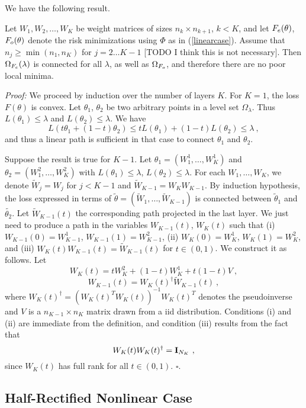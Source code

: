 We have the following result.
\begin{proposition}
\label{proplinear}
Let $W_1, W_2, \dots, W_K$ be weight matrices of sizes 
$n_k \times n_{k+1}$, $k < K$, and let $F_{e}(\theta)$, $F_{o}(\theta)$ 
denote the risk minimizations using $\Phi$ as in (\ref{linearcase}).
Assume that $n_j \geq \min(n_1, n_K)$ for $j=2 \dots K-1$ [TODO I think this is not necessary].
Then $\Omega_{F_{e}}(\lambda)$ is connected for all $\lambda$, as well as $\Omega_{F_{o}}$, 
and therefore there are no poor local minima.  
\end{proposition}
{\it Proof:} We proceed by induction over the number of layers $K$. 
For $K=1$, the loss $F(\theta)$ is convex. Let  $\theta_1$, $\theta_2$ be two arbitrary points 
in a level set $\Omega_\lambda$. Thus $L(\theta_1) \leq \lambda$ and $L(\theta_2) \leq \lambda$. We have
$$L( t \theta_1 + (1-t) \theta_2) \leq t L(\theta_1) + (1-t) L(\theta_2) \leq \lambda~,$$
and thus a linear path is sufficient in that case to connect $\theta_1$ and $\theta_2$.

Suppose the result is true for $K-1$. Let $\theta_1 = (W_1^1, \dots, W^1_K)$ and 
 $\theta_2 = (W_1^2, \dots, W^2_K)$ with $L(\theta_1) \leq \lambda$, $L(\theta_2) \leq \lambda$.
For each $W_1, \dots, W_K$, we denote $\tilde{W}_j = W_j$ for $j < K-1$ and
$\tilde{W}_{K-1} = W_K W_{K-1}$. By induction hypothesis, the 
loss expressed in terms of $\tilde{\theta} = (\tilde{W}_1, \dots, \tilde{W}_{K-1})$ is connected 
between $\tilde{\theta}_1$ and $\tilde{\theta_2}$. Let $\tilde{W}_{K-1}(t)$ the corresponding 
path projected in the last layer. We just need to produce a path in the variables $W_{K-1}(t)$, $W_K(t)$ 
such that (i) $W_{K-1}(0) = W_{K-1}^1$, $W_{K-1}(1) = W_{K-1}^2$, 
(ii) $W_{K}(0) = W_{K}^1$, $W_{K}(1) = W_{K}^2$, and 
(iii) $W_{K}(t) W_{K-1}(t) = \tilde{W}_{K-1}(t)$ for $t \in (0,1)$. 
We construct it as follows. Let 
$$W_{K}(t) = t W_{K}^2 + (1-t) W_{K}^1 + t (1-t) V~,$$
$$W_{K-1}(t) = W_{K}(t)^\dagger \tilde{W}_{K-1}(t)  ~,$$
where $W_{K}(t)^\dagger = ( W_{K}(t)^T W_{K}(t))^{-1} W_{K}(t)^T$ denotes the pseudoinverse 
and $V$ is a $n_{K-1} \times n_{K}$ matrix drawn from a iid distribution. 
Conditions (i) and (ii) are immediate from the definition, and condition (iii) results from the fact that 
$$W_{K}(t) W_{K}(t)^\dagger  = {\bf I}_{N_K}~,$$
since $W_K(t)$ has full rank for all $t \in (0,1)$. 
$\square$.

\subsection{Half-Rectified Nonlinear Case}

